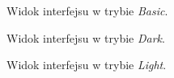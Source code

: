 \documentclass[twoside,a4paper]{book}
\begin{document}
 \begin{figure}
		\centering
		\caption{Widok interfejsu w trybie \textit{Basic}.}
		\label{fig:basic}
		\end{figure}
		 \begin{figure}
		\centering
		\caption{Widok interfejsu w trybie \textit{Dark}.}
		\label{fig:dark}
		\end{figure}
		 \begin{figure}
		\centering
		\caption{Widok interfejsu w trybie \textit{Light}.}
		\label{fig:light}
		\end{figure}
\end{document}

